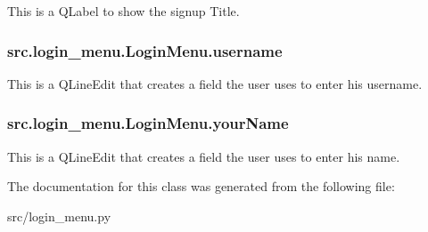 This is a Q\+Label to show the signup Title. 

\hypertarget{classsrc_1_1login__menu_1_1_login_menu_a6b5acd3b5dd7c538b601cf8ab1b1d4cf}{}
\subsubsection[{username}]{\setlength{\rightskip}{0pt plus 5cm}src.\+login\+\_\+menu.\+Login\+Menu.\+username}\label{classsrc_1_1login__menu_1_1_login_menu_a6b5acd3b5dd7c538b601cf8ab1b1d4cf}


This is a Q\+Line\+Edit that creates a field the user uses to enter his username. 

\hypertarget{classsrc_1_1login__menu_1_1_login_menu_a6ba84d7d5a18940588ad710b7f6f964c}{}
\subsubsection[{your\+Name}]{\setlength{\rightskip}{0pt plus 5cm}src.\+login\+\_\+menu.\+Login\+Menu.\+your\+Name}\label{classsrc_1_1login__menu_1_1_login_menu_a6ba84d7d5a18940588ad710b7f6f964c}


This is a Q\+Line\+Edit that creates a field the user uses to enter his name. 



The documentation for this class was generated from the following file\+:\begin{DoxyCompactItemize}
\item 
src/login\+\_\+menu.\+py\end{DoxyCompactItemize}
